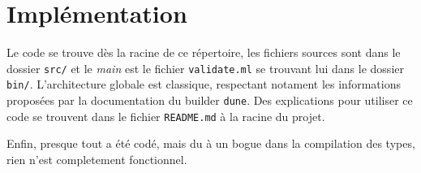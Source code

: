 \documentclass[twoside,12pt]{article}
\begin{document}


\section{Implémentation}

Le code se trouve dès la racine de ce répertoire, les fichiers sources sont
dans le dossier \texttt{src/} et le \textit{main} est le fichier \texttt{validate.ml}
se trouvant lui dans le dossier \texttt{bin/}. L'architecture globale est
classique, respectant notament les informations proposées par la documentation
du builder \texttt{dune}.
Des explications pour utiliser ce code se trouvent dans le fichier \texttt{README.md}
à la racine du projet.

Enfin, presque tout a été codé, mais du à un bogue dans la compilation des types,
rien n'est completement fonctionnel.

\end{document}
